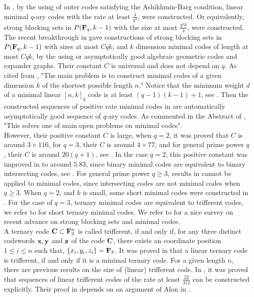 \documentclass[12pt]{article}
\begin{document}
In \cite[Corollary 3.3]{Bartoli}, by the using of outer codes satisfying the Ashikhmin-Barg condition, linear minimal $q$-ary codes with the rate at least $\frac{4}{q^4}$, were constructed. Or equivalently, strong blocking sets in $P({\bf F}_q, k-1)$ with the size at most $\frac{q^4k}{4}$, were constructed. The recent breakthrough in \cite{Alon} gave constructions of strong blocking sets in $P({\bf F}_q,k-1)$ with sizes at most $Cqk$, and $k$ dimension minimal codes of length at most $Cqk$, by the using or asymptotically good algebraic geometric codes and expander graphs. Their constant $C$ is universal and does not depend on $q$. As cited from \cite{Alon}, "The main problem is to construct minimal codes of a given dimension $k$ of the shortest possible length $n$."  Notice that the minimum weight $d$ of a minimal linear $[n,k]_q$ code is at least $(q-1)(k-1)+1$, see \cite{Alfarano}. Then the constructed sequences of positive rate minimal codes in \cite{Alon} are automatically asymptotically good sequence of $q$-ary codes. As commented in the Abstract of \cite{Alon}, "This solves one of main open problems on minimal codes".\\

However, their positive constant $C$ is large, when $q=2$, it was proved that $C$ is around $3 \times 116$, for $q=3$, their $C$ is around $4 \times 77$, and for general prime power $q$, their $C$ is around $20(q+1)$, see
\cite[Table 3]{Alon}. In the case $q=2$, this positive constant was improved in \cite{Borello} to around $5.83$, since binary minimal
 codes are equivalent to binary intersecting codes, see \cite[Table 3]{Borello}. For general prime power $q \geq 3$, results in \cite[Table 3]{Borello} cannot be applied to minimal codes, since intersecting codes are not minimal codes when $q \geq 3$. When $q=2$, and $k$ is small, some short minimal codes were constructed in \cite{Kurz,CZ}. For the case of $q=3$, ternary minimal codes are equivalent to trifferent codes, we refer to \cite{Bishnoi} for short ternary minimal codes. We refer to \cite{Scotti1} for a nice survey on recent advance on strong blocking sets and minimal codes.\\

A ternary code ${\bf C} \subset {\bf F}_3^n$ is called trifferent, if and only if, for any three distinct codewords ${\bf x}, {\bf y} $ and ${\bf z}$ of the code ${\bf C}$, there exists an coordinate position $1\leq i \leq n$ such that, $\{x_i,y_i,z_i\}={\bf F}_3$. It was proved in \cite{Bishnoi} that a linear ternary code is trifferent, if and only if it is a minimal ternary code. For a given length $n$, there are previous results on the size of (linear) trifferent code. In \cite[Theorem 1.7]{Bishnoi}, it was proved that sequences of linear trifferent codes of the rate at least $\frac{23}{312}$ can be constructed explicitly. Their proof in \cite{Bishnoi} depends on an argument of Alon in \cite{Alon1}.\\
\end{document}
